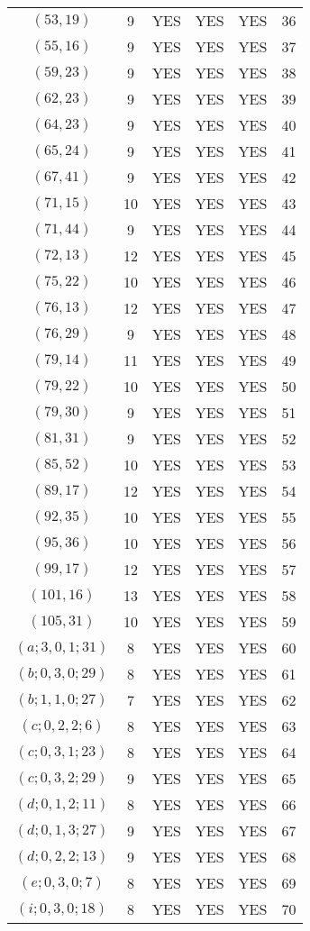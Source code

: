 \begin{longtable}{|c|c|c|c|c|c|}
$(53, 19)$ & 9 & YES & YES & YES & 36\\
$(55, 16)$ & 9 & YES & YES & YES & 37\\
$(59, 23)$ & 9 & YES & YES & YES & 38\\
$(62, 23)$ & 9 & YES & YES & YES & 39\\
$(64, 23)$ & 9 & YES & YES & YES & 40\\
$(65, 24)$ & 9 & YES & YES & YES & 41\\
$(67, 41)$ & 9 & YES & YES & YES & 42\\
$(71, 15)$ & 10 & YES & YES & YES & 43\\
$(71, 44)$ & 9 & YES & YES & YES & 44\\
$(72, 13)$ & 12 & YES & YES & YES & 45\\
$(75, 22)$ & 10 & YES & YES & YES & 46\\
$(76, 13)$ & 12 & YES & YES & YES & 47\\
$(76, 29)$ & 9 & YES & YES & YES & 48\\
$(79, 14)$ & 11 & YES & YES & YES & 49\\
$(79, 22)$ & 10 & YES & YES & YES & 50\\
$(79, 30)$ & 9 & YES & YES & YES & 51\\
$(81, 31)$ & 9 & YES & YES & YES & 52\\
$(85, 52)$ & 10 & YES & YES & YES & 53\\
$(89, 17)$ & 12 & YES & YES & YES & 54\\
$(92, 35)$ & 10 & YES & YES & YES & 55\\
$(95, 36)$ & 10 & YES & YES & YES & 56\\
$(99, 17)$ & 12 & YES & YES & YES & 57\\
$(101, 16)$ & 13 & YES & YES & YES & 58\\
$(105, 31)$ & 10 & YES & YES & YES & 59\\
$(a; 3, 0, 1; 31)$ & 8 & YES & YES & YES & 60\\
$(b; 0, 3, 0; 29)$ & 8 & YES & YES & YES & 61\\
$(b; 1, 1, 0; 27)$ & 7 & YES & YES & YES & 62\\
$(c; 0, 2, 2; 6)$ & 8 & YES & YES & YES & 63\\
$(c; 0, 3, 1; 23)$ & 8 & YES & YES & YES & 64\\
$(c; 0, 3, 2; 29)$ & 9 & YES & YES & YES & 65\\
$(d; 0, 1, 2; 11)$ & 8 & YES & YES & YES & 66\\
$(d; 0, 1, 3; 27)$ & 9 & YES & YES & YES & 67\\
$(d; 0, 2, 2; 13)$ & 9 & YES & YES & YES & 68\\
$(e; 0, 3, 0; 7)$ & 8 & YES & YES & YES & 69\\
$(i; 0, 3, 0; 18)$ & 8 & YES & YES & YES & 70
\end{longtable}
